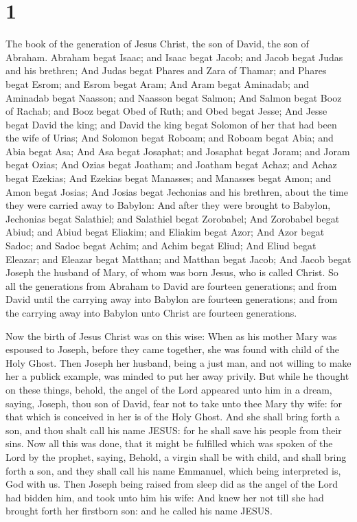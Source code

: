 \hypertarget{section}{%
\section{1}\label{section}}

 The book of the generation of Jesus Christ, the son of
David, the son of Abraham.  Abraham begat Isaac; and Isaac
begat Jacob; and Jacob begat Judas and his brethren;  And
Judas begat Phares and Zara of Thamar; and Phares begat Esrom; and Esrom
begat Aram;  And Aram begat Aminadab; and Aminadab begat
Naasson; and Naasson begat Salmon;  And Salmon begat Booz
of Rachab; and Booz begat Obed of Ruth; and Obed begat Jesse;
 And Jesse begat David the king; and David the king begat
Solomon of her that had been the wife of Urias;  And
Solomon begat Roboam; and Roboam begat Abia; and Abia begat Asa;
 And Asa begat Josaphat; and Josaphat begat Joram; and
Joram begat Ozias;  And Ozias begat Joatham; and Joatham
begat Achaz; and Achaz begat Ezekias;  And Ezekias begat
Manasses; and Manasses begat Amon; and Amon begat Josias;
 And Josias begat Jechonias and his brethren, about the
time they were carried away to Babylon:  And after they
were brought to Babylon, Jechonias begat Salathiel; and Salathiel begat
Zorobabel;  And Zorobabel begat Abiud; and Abiud begat
Eliakim; and Eliakim begat Azor;  And Azor begat Sadoc;
and Sadoc begat Achim; and Achim begat Eliud;  And Eliud
begat Eleazar; and Eleazar begat Matthan; and Matthan begat Jacob;
 And Jacob begat Joseph the husband of Mary, of whom was
born Jesus, who is called Christ.  So all the generations
from Abraham to David are fourteen generations; and from David until the
carrying away into Babylon are fourteen generations; and from the
carrying away into Babylon unto Christ are fourteen generations.

 Now the birth of Jesus Christ was on this wise: When as
his mother Mary was espoused to Joseph, before they came together, she
was found with child of the Holy Ghost.  Then Joseph her
husband, being a just man, and not willing to make her a publick
example, was minded to put her away privily.  But while
he thought on these things, behold, the angel of the Lord appeared unto
him in a dream, saying, Joseph, thou son of David, fear not to take unto
thee Mary thy wife: for that which is conceived in her is of the Holy
Ghost.  And she shall bring forth a son, and thou shalt
call his name JESUS: for he shall save his people from their sins.
 Now all this was done, that it might be fulfilled which
was spoken of the Lord by the prophet, saying,  Behold, a
virgin shall be with child, and shall bring forth a son, and they shall
call his name Emmanuel, which being interpreted is, God with us.
 Then Joseph being raised from sleep did as the angel of
the Lord had bidden him, and took unto him his wife:  And
knew her not till she had brought forth her firstborn son: and he called
his name JESUS.

